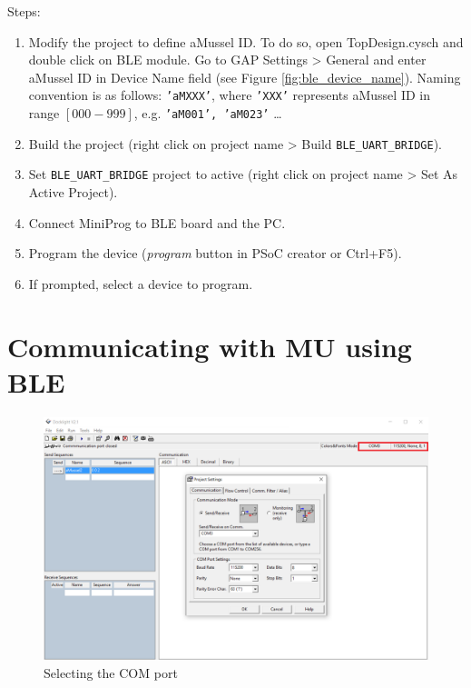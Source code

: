 Steps:
\begin{enumerate}
	\item Modify the project to define aMussel ID. To do so, open TopDesign.cysch and double click on BLE module. Go to GAP Settings > General and enter aMussel ID in Device Name field (see Figure \ref{fig:ble_device_name}). Naming convention is as follows: \texttt{'aMXXX'}, where \texttt{'XXX'} represents aMussel ID in range $[000-999]$, e.g. \texttt{'aM001', 'aM023'} \ldots
	\item Build the project (right click on project name > Build \texttt{BLE\_UART\_BRIDGE}).
	\item Set \texttt{BLE\_UART\_BRIDGE} project to active (right click on project name > Set As Active Project).
	\item Connect MiniProg to BLE board and the PC.
	\item Program the device (\textit{program} button in PSoC creator or Ctrl+F5).
	\item If prompted, select a device to program.
\end{enumerate}

\section{Communicating with MU using BLE}

\begin{figure}[htb]
    \centering
	  \includegraphics[width=\linewidth]{figures/Docklight_COM.png}
	\caption{Selecting the COM port}
	\label{fig:docklight_com}
\end{figure}

